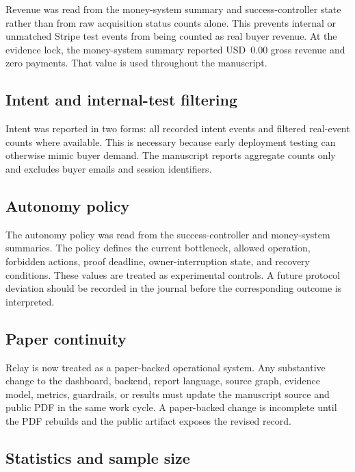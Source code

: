 \documentclass[12pt,letterpaper]{article}
\begin{document}
Revenue was read from the money-system summary and success-controller state rather than from raw acquisition status counts alone. This prevents internal or unmatched Stripe test events from being counted as real buyer revenue. At the evidence lock, the money-system summary reported USD~0.00 gross revenue and zero payments. That value is used throughout the manuscript.

\subsection{Intent and internal-test filtering}

Intent was reported in two forms: all recorded intent events and filtered real-event counts where available. This is necessary because early deployment testing can otherwise mimic buyer demand. The manuscript reports aggregate counts only and excludes buyer emails and session identifiers.

\subsection{Autonomy policy}

The autonomy policy was read from the success-controller and money-system summaries. The policy defines the current bottleneck, allowed operation, forbidden actions, proof deadline, owner-interruption state, and recovery conditions. These values are treated as experimental controls. A future protocol deviation should be recorded in the journal before the corresponding outcome is interpreted.

\subsection{Paper continuity}

Relay is now treated as a paper-backed operational system. Any substantive change to the dashboard, backend, report language, source graph, evidence model, metrics, guardrails, or results must update the manuscript source and public PDF in the same work cycle. A paper-backed change is incomplete until the PDF rebuilds and the public artifact exposes the revised record.

\subsection{Statistics and sample size}
\end{document}
